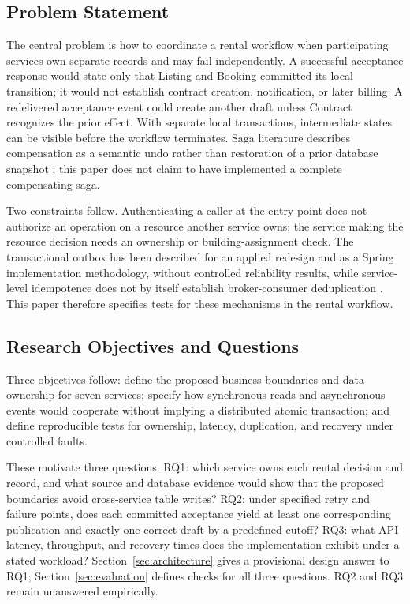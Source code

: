 \subsection{Problem Statement}
The central problem is how to coordinate a rental workflow when participating services own separate records and may fail independently. A successful acceptance response would state only that Listing and Booking committed its local transition; it would not establish contract creation, notification, or later billing. A redelivered acceptance event could create another draft unless Contract recognizes the prior effect. With separate local transactions, intermediate states can be visible before the workflow terminates. Saga literature describes compensation as a semantic undo rather than restoration of a prior database snapshot \cite{garciamolina1987sagas,stefanko2019saga}; this paper does not claim to have implemented a complete compensating saga.

Two constraints follow. Authenticating a caller at the entry point does not authorize an operation on a resource another service owns; the service making the resource decision needs an ownership or building-assignment check. The transactional outbox has been described for an applied redesign and as a Spring implementation methodology, without controlled reliability results, while service-level idempotence does not by itself establish broker-consumer deduplication \cite{peliza2025outbox,glybovets2024transactions,ramalingam2013idempotence}. This paper therefore specifies tests for these mechanisms in the rental workflow.

\subsection{Research Objectives and Questions}
Three objectives follow: define the proposed business boundaries and data ownership for seven services; specify how synchronous reads and asynchronous events would cooperate without implying a distributed atomic transaction; and define reproducible tests for ownership, latency, duplication, and recovery under controlled faults.

These motivate three questions. RQ1: which service owns each rental decision and record, and what source and database evidence would show that the proposed boundaries avoid cross-service table writes? RQ2: under specified retry and failure points, does each committed acceptance yield at least one corresponding publication and exactly one correct draft by a predefined cutoff? RQ3: what API latency, throughput, and recovery times does the implementation exhibit under a stated workload? Section~\ref{sec:architecture} gives a provisional design answer to RQ1; Section~\ref{sec:evaluation} defines checks for all three questions. RQ2 and RQ3 remain unanswered empirically.

